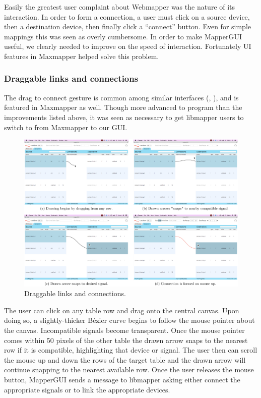 Easily the greatest user complaint about Webmapper was the nature of its interaction. In order to form a connection, a user must click on a source device, then a destination device, then finally click a ``connect'' button. Even for simple mappings this was seen as overly cumbersome. In order to make MapperGUI useful, we clearly needed to improve on the speed of interaction. Fortunately UI features in Maxmapper helped solve this problem.
	
		\subsubsection{Draggable links and connections}

The drag to connect gesture is common among similar interfaces (, ), and is featured in Maxmapper as well. Though more advanced to program than the improvements listed above, it was seen as necessary to get libmapper users to switch to from Maxmapper to our GUI.

\begin{figure}[h]
	\centering
	\includegraphics[width=1\textwidth]{figures/drawing}
	\caption{Draggable links and connections.}
	\label{fig:drawing}
\end{figure}

The user can click on any table row and drag onto the central canvas. Upon doing so, a slightly-thicker B\'ezier curve begins to follow the mouse pointer about the canvas. Incompatible signals become transparent. Once the mouse pointer comes within 50 pixels of the other table the drawn arrow snaps to the nearest row if it is compatible, highlighting that device or signal. The user then can scroll the mouse up and down the rows of the target table and the drawn arrow will continue snapping to the nearest available row. Once the user releases the mouse button, MapperGUI sends a message to libmapper asking either connect the appropriate signals or to link the appropriate devices.

